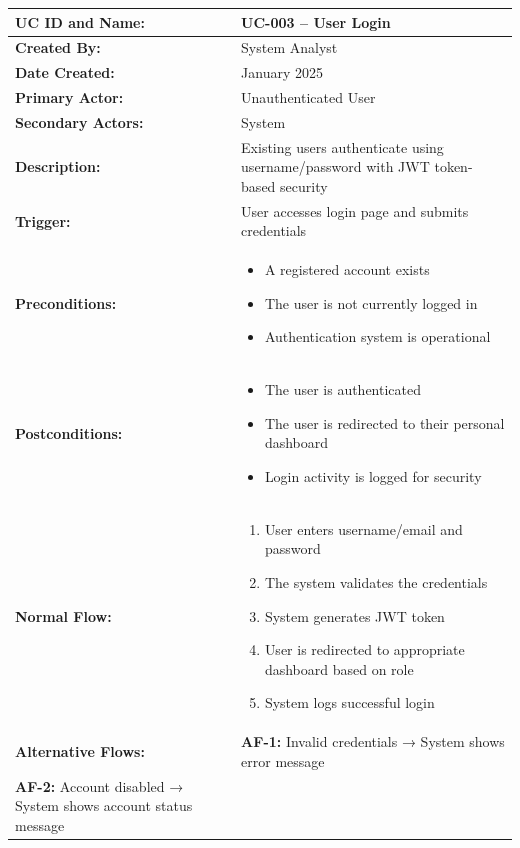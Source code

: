 \documentclass[12pt,a4paper]{article}
\begin{document}
\renewcommand{\arraystretch}{1.5}
\begin{longtable}{|p{4.5cm}|p{10.5cm}|}
\hline
\textbf{UC ID and Name:} & UC-003 – User Login \\
\hline
\textbf{Created By:} & System Analyst \\
\hline
\textbf{Date Created:} & January 2025 \\
\hline
\textbf{Primary Actor:} & Unauthenticated User \\
\hline
\textbf{Secondary Actors:} & System \\
\hline
\textbf{Description:} & Existing users authenticate using username/password with JWT token-based security \\
\hline
\textbf{Trigger:} & User accesses login page and submits credentials \\
\hline
\textbf{Preconditions:} &
\begin{itemize}
  \item A registered account exists
  \item The user is not currently logged in
  \item Authentication system is operational
\end{itemize} \\
\hline
\textbf{Postconditions:} &
\begin{itemize}
  \item The user is authenticated
  \item The user is redirected to their personal dashboard
  \item Login activity is logged for security
\end{itemize} \\
\hline
\textbf{Normal Flow:} &
\begin{enumerate}
  \item User enters username/email and password
  \item The system validates the credentials
  \item System generates JWT token
  \item User is redirected to appropriate dashboard based on role
  \item System logs successful login
\end{enumerate} \\
\hline
\textbf{Alternative Flows:} &
\textbf{AF-1:} Invalid credentials → System shows error message \\
\textbf{AF-2:} Account disabled → System shows account status message \\
\hline

\end{longtable}
\end{document}
